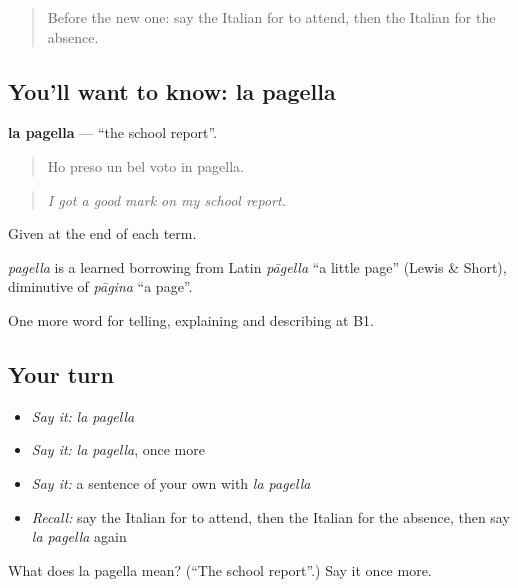 \begin{quote}
Before the new one: say the Italian for to attend, then the Italian for the absence.
\end{quote}

\subsection*{You'll want to know: la pagella}
\textbf{la pagella} — \textquotedblleft{}the school report\textquotedblright{}.

\begin{quote}
Ho preso un bel voto in pagella.
\end{quote}

\begin{quote}
\emph{I got a good mark on my school report.}
\end{quote}

Given at the end of each term.

\begin{cousinweb}
\emph{pagella} is a learned borrowing from Latin \emph{pāgella} \textquotedblleft{}a little page\textquotedblright{} (Lewis \& Short), diminutive of \emph{pāgina} \textquotedblleft{}a page\textquotedblright{}.
\end{cousinweb}

\begin{grammarlens}[title={What you've built}]
One more word for telling, explaining and describing at B1.
\end{grammarlens}

\subsection*{Your turn}
\begin{itemize}
\raggedright
  \item \emph{Say it:} \emph{la pagella}
  \item \emph{Say it:} \emph{la pagella}, once more
  \item \emph{Say it:} a sentence of your own with \emph{la pagella}
  \item \emph{Recall:} say the Italian for to attend, then the Italian for the absence, then say \emph{la pagella} again
\end{itemize}

\begin{tcolorbox}[breakable,colback=teal!4,colframe=teal!35!black,title={Before you move on}]
What does la pagella mean? (\textquotedblleft{}The school report\textquotedblright{}.) Say it once more.
\end{tcolorbox}
